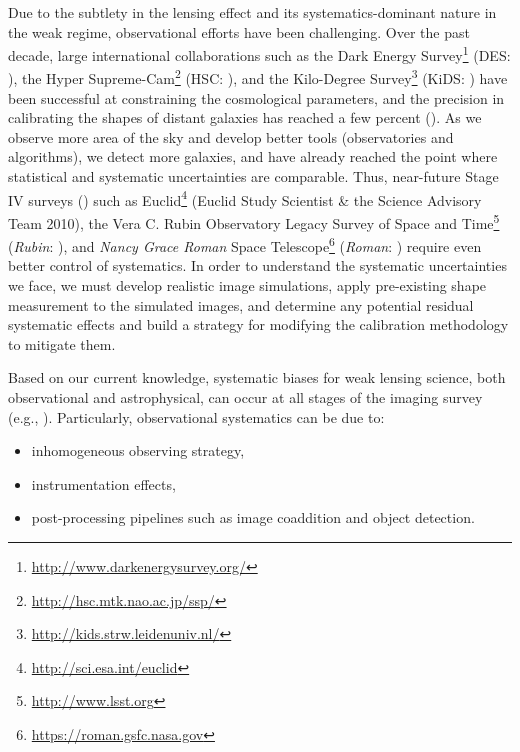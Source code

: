 \documentclass[fleqn,usenatbib]{mnras}
\begin{document}
Due to the subtlety in the lensing effect and its systematics-dominant nature in the weak regime, observational efforts have been challenging. Over the past decade, large international collaborations such as the Dark Energy Survey\footnote{\url{http://www.darkenergysurvey.org/}} (DES: \citealt{2005astro.ph.10346T}), the Hyper Supreme-Cam\footnote{\url{http://hsc.mtk.nao.ac.jp/ssp/}} (HSC: \citealt{2018PASJ...70S...4A}), and the Kilo-Degree Survey\footnote{\url{http://kids.strw.leidenuniv.nl/}} (KiDS: \citealt{2013ExA....35...25D}) have been successful at constraining the cosmological parameters, and the precision in calibrating the shapes of distant galaxies has reached a few percent (\citealt{2020arXiv201103408G, 2020arXiv201208567M, 2021A&A...645A.105G}). As we observe more area of the sky and develop better tools (observatories and algorithms), we detect more galaxies, and have already reached the point where statistical and systematic uncertainties are comparable. Thus, near-future Stage IV surveys (\citealt{2006astro.ph..9591A}) such as Euclid\footnote{\url{ http://sci.esa.int/euclid}} (Euclid Study Scientist \& the Science Advisory Team 2010), the Vera C. Rubin Observatory Legacy Survey of Space and Time\footnote{\url{ http://www.lsst.org}} (\emph{Rubin}: \citealt{2009arXiv0912.0201L, 2019ApJ...873..111I}), and \emph{Nancy Grace Roman} Space Telescope\footnote{\url{https://roman.gsfc.nasa.gov}} (\emph{Roman}: \citealt{2015arXiv150303757S}) require even better control of systematics. In order to understand the systematic uncertainties we face, we must develop realistic image simulations, apply pre-existing shape measurement to the simulated images, and determine any potential residual systematic effects and build a strategy for modifying the calibration methodology to mitigate them.  


Based on our current knowledge, systematic biases for weak lensing science, both observational and astrophysical, can occur at all stages of the imaging survey (e.g., \citealt{2018ARA&A..56..393M}). Particularly, observational systematics can be due to: 
\begin{itemize}
    \item inhomogeneous observing strategy,
    \item instrumentation effects,
    \item post-processing pipelines such as image coaddition and object detection.
\end{itemize} 
\end{document}
